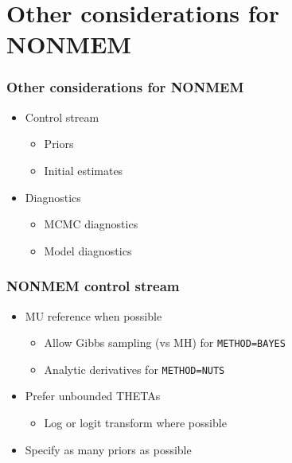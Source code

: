 \documentclass{beamer}
\begin{document}


\section{Other considerations for NONMEM}

\begin{frame}
  \frametitle{Other considerations for NONMEM}

  \begin{itemize}
  \item Control stream
    \begin{itemize}
      \item Priors
      \item Initial estimates
    \end{itemize}
  \item Diagnostics
    \begin{itemize}
      \item MCMC diagnostics
      \item Model diagnostics
    \end{itemize}
  \end{itemize}

\end{frame}

\begin{frame}[fragile]
  \frametitle{NONMEM control stream}

\begin{itemize}
  \item<1-> MU reference when possible
        \begin{itemize}
          \item Allow Gibbs sampling (vs MH) for \verb|METHOD=BAYES|
          \item Analytic derivatives for \verb|METHOD=NUTS|
        \end{itemize}
  \item<2-> Prefer unbounded THETAs
        \begin{itemize}
          \item Log or logit transform where possible
        \end{itemize}
  \item<3-> Specify as many priors as possible
\end{itemize}

\end{frame}
\end{document}
